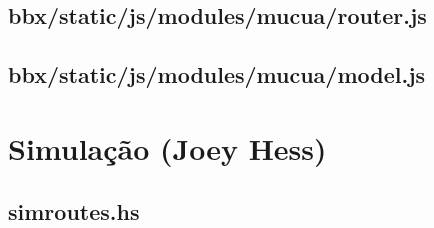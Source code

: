 \subsection{bbx/static/js/modules/mucua/router.js}


\subsection{bbx/static/js/modules/mucua/model.js}


\section{Simulação (Joey Hess)}

\subsection{simroutes.hs}


